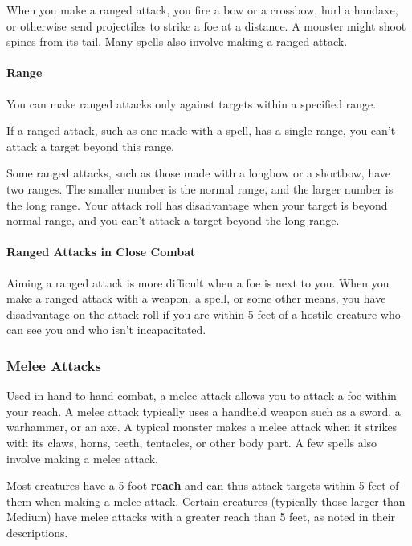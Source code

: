 \documentclass[
]{article}
\begin{document}
When you make a ranged attack, you fire a bow or a crossbow, hurl a
handaxe, or otherwise send projectiles to strike a foe at a distance. A
monster might shoot spines from its tail. Many spells also involve
making a ranged attack.

\hypertarget{range}{%
\paragraph{Range}\label{range}}

You can make ranged attacks only against targets within a specified
range.

If a ranged attack, such as one made with a spell, has a single range,
you can't attack a target beyond this range.

Some ranged attacks, such as those made with a longbow or a shortbow,
have two ranges. The smaller number is the normal range, and the larger
number is the long range. Your attack roll has disadvantage when your
target is beyond normal range, and you can't attack a target beyond the
long range.

\hypertarget{ranged-attacks-in-close-combat}{%
\paragraph{Ranged Attacks in Close
Combat}\label{ranged-attacks-in-close-combat}}

Aiming a ranged attack is more difficult when a foe is next to you. When
you make a ranged attack with a weapon, a spell, or some other means,
you have disadvantage on the attack roll if you are within 5 feet of a
hostile creature who can see you and who isn't incapacitated.

\hypertarget{melee-attacks}{%
\subsubsection{Melee Attacks}\label{melee-attacks}}

Used in hand-to-hand combat, a melee attack allows you to attack a foe
within your reach. A melee attack typically uses a handheld weapon such
as a sword, a warhammer, or an axe. A typical monster makes a melee
attack when it strikes with its claws, horns, teeth, tentacles, or other
body part. A few spells also involve making a melee attack.

Most creatures have a 5-foot \textbf{reach} and can thus attack targets
within 5 feet of them when making a melee attack. Certain creatures
(typically those larger than Medium) have melee attacks with a greater
reach than 5 feet, as noted in their descriptions.
\end{document}
